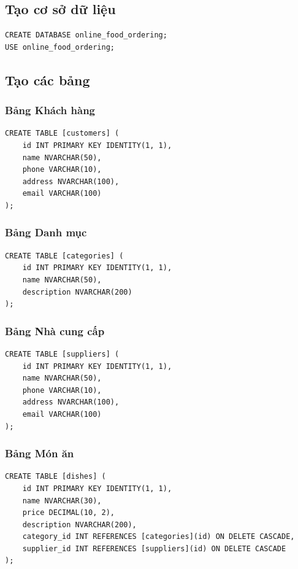 \documentclass{article}
\begin{document}
\subsection{Tạo cơ sở dữ liệu}

\begin{verbatim}
CREATE DATABASE online_food_ordering;
USE online_food_ordering;
\end{verbatim}

\subsection{Tạo các bảng}

\subsubsection{Bảng Khách hàng}

\begin{verbatim}
CREATE TABLE [customers] (
    id INT PRIMARY KEY IDENTITY(1, 1),
    name NVARCHAR(50),
    phone VARCHAR(10),
    address NVARCHAR(100),
    email VARCHAR(100)
);
\end{verbatim}

\subsubsection{Bảng Danh mục}

\begin{verbatim}
CREATE TABLE [categories] (
    id INT PRIMARY KEY IDENTITY(1, 1),
    name NVARCHAR(50),
    description NVARCHAR(200)
);
\end{verbatim}

\subsubsection{Bảng Nhà cung cấp}

\begin{verbatim}
CREATE TABLE [suppliers] (
    id INT PRIMARY KEY IDENTITY(1, 1),
    name NVARCHAR(50),
    phone VARCHAR(10),
    address NVARCHAR(100),
    email VARCHAR(100)
);
\end{verbatim}

\subsubsection{Bảng Món ăn}

\begin{verbatim}
CREATE TABLE [dishes] (
    id INT PRIMARY KEY IDENTITY(1, 1),
    name NVARCHAR(30),
    price DECIMAL(10, 2),
    description NVARCHAR(200),
    category_id INT REFERENCES [categories](id) ON DELETE CASCADE,
    supplier_id INT REFERENCES [suppliers](id) ON DELETE CASCADE
);
\end{verbatim}
\end{document}
